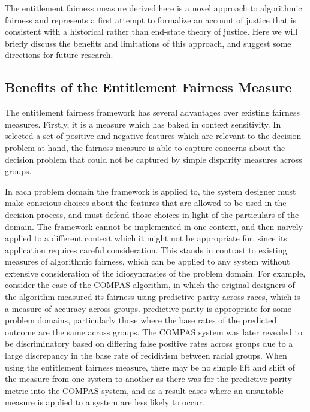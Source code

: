 The entitlement fairness measure derived here is a novel approach to algorithmic
fairness and represents a first attempt to formalize an account of justice that
is consistent with a historical rather than end-state theory of justice. Here we
will briefly discuss the benefits and limitations of this approach, and suggest
some directions for future research.

\subsection{Benefits of the Entitlement Fairness Measure}

The entitlement fairness framework has several advantages over existing fairness
measures. Firstly, it is a measure which has baked in context sensitivity. In
selected a set of positive and negative features which are relevant to the
decision problem at hand, the fairness measure is able to capture concerns about
the decision problem that could not be captured by simple disparity measures
across groups. 

In each problem domain the framework is applied to, the system designer must
make conscious choices about the features that are allowed to be used in the 
decision process, and must defend those choices in light of the particulars of
the domain. The framework cannot be implemented in one context, and then naively
applied to a different context which it might not be appropriate for, since its
application requires careful consideration. This stands in contrast
to existing measures of algorithmic fairness, which can be applied to any system
without extensive consideration of the idiosyncrasies of the problem domain. For
example, consider the case of the COMPAS algorithm, in which the original
designers of the algorithm measured its fairness using predictive parity across
races, which is a measure of accuracy across groups. predictive parity is
appropriate for some problem domains, particularly those where the base rates of
the predicted outcome are the same across groups. The COMPAS system was later
revealed to be discriminatory based on differing false positive rates across 
groups due to a large discrepancy in the base rate of recidivism between racial
groups. When using the entitlement fairness measure, there may be no simple lift
and shift of the measure from one system to another as there was for the
predictive parity metric into the COMPAS system, and as a result cases where an
unsuitable measure is applied to a system are less likely to occur.

